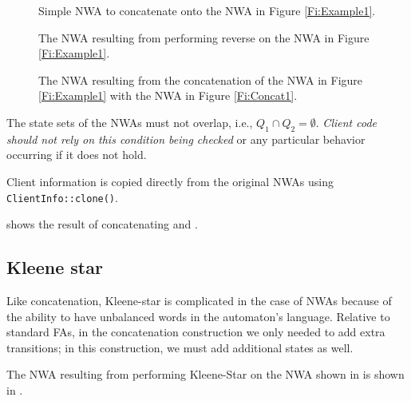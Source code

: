\begin{figure}[p]
  \centering
  \begin{minipage}{0.5\textwidth}
    \begin{minipage}{\textwidth}
      \centering
      \caption{Simple NWA to concatenate onto the NWA in Figure \ref{Fi:Example1}.}
      \label{Fi:Concat1}
    \end{minipage}

    \vspace{2\baselineskip}
    \begin{minipage}{0.8\textwidth}
      \centering
      \caption{The NWA resulting from performing reverse on the NWA in Figure \ref{Fi:Example1}.}
      \label{Fi:Reverse1}
    \end{minipage}
  \end{minipage}
  \begin{minipage}{0.49\textwidth}
    \centering
    \caption{The NWA resulting from the concatenation of the NWA in Figure
      \ref{Fi:Example1} with the NWA in Figure \ref{Fi:Concat1}.}
    \label{Fi:Concat2}
  \end{minipage}
\end{figure}

\antistupidfloats



The state sets of the NWAs must not overlap,
i.e., $Q_1 \cap Q_2 = \emptyset$. \textsl{Client code should not rely on
  this condition being checked} or any particular behavior occurring if it
does not hold.

Client information is copied directly from the original NWAs using
\texttt{ClientInfo::clone()}.

 shows the result of concatenating  and
.

\subsection{Kleene star}
\label{Se:Star}

Like concatenation, Kleene-star is complicated in the case of NWAs because of
the ability to have unbalanced words in the automaton's
language. Relative to standard FAs, in the concatenation construction we only needed
to add extra transitions; in this construction, we must add additional states
as well.

The NWA resulting from performing Kleene-Star on the NWA shown in
 is shown in .


